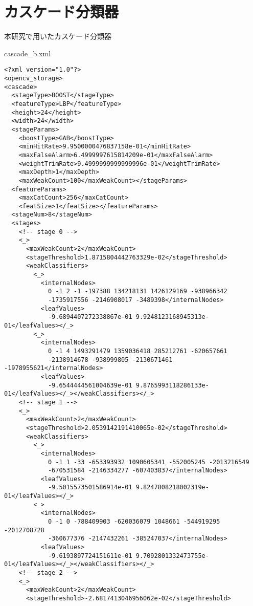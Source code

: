 \chapter{カスケード分類器}
\thispagestyle{fancy}

本研究で用いたカスケード分類器

\vspace{1cm}

cascade\_b.xml

\begin{lstlisting}
<?xml version="1.0"?>
<opencv_storage>
<cascade>
  <stageType>BOOST</stageType>
  <featureType>LBP</featureType>
  <height>24</height>
  <width>24</width>
  <stageParams>
    <boostType>GAB</boostType>
    <minHitRate>9.9500000476837158e-01</minHitRate>
    <maxFalseAlarm>6.4999997615814209e-01</maxFalseAlarm>
    <weightTrimRate>9.4999999999999996e-01</weightTrimRate>
    <maxDepth>1</maxDepth>
    <maxWeakCount>100</maxWeakCount></stageParams>
  <featureParams>
    <maxCatCount>256</maxCatCount>
    <featSize>1</featSize></featureParams>
  <stageNum>8</stageNum>
  <stages>
    <!-- stage 0 -->
    <_>
      <maxWeakCount>2</maxWeakCount>
      <stageThreshold>1.8715804442763329e-02</stageThreshold>
      <weakClassifiers>
        <_>
          <internalNodes>
            0 -1 2 -1 -197388 134218131 1426129169 -938966342
            -1735917556 -2146908017 -3489398</internalNodes>
          <leafValues>
            -9.6894407272338867e-01 9.9248123168945313e-01</leafValues></_>
        <_>
          <internalNodes>
            0 -1 4 1493291479 1359036418 285212761 -620657661
            -2138914678 -938999805 -2130671461 -1978955621</internalNodes>
          <leafValues>
            -9.6544444561004639e-01 9.8765993118286133e-01</leafValues></_></weakClassifiers></_>
    <!-- stage 1 -->
    <_>
      <maxWeakCount>2</maxWeakCount>
      <stageThreshold>2.0539142191410065e-02</stageThreshold>
      <weakClassifiers>
        <_>
          <internalNodes>
            0 -1 1 -33 -653393932 1090605341 -552005245 -2013216549
            -670531584 -2146334277 -607403837</internalNodes>
          <leafValues>
            -9.5015573501586914e-01 9.8247808218002319e-01</leafValues></_>
        <_>
          <internalNodes>
            0 -1 0 -788409903 -620036079 1048661 -544919295 -2012708728
            -360677376 -2147432261 -385247037</internalNodes>
          <leafValues>
            -9.6193897724151611e-01 9.7092801332473755e-01</leafValues></_></weakClassifiers></_>
    <!-- stage 2 -->
    <_>
      <maxWeakCount>2</maxWeakCount>
      <stageThreshold>-2.6817413046956062e-02</stageThreshold>

\end{lstlisting}
